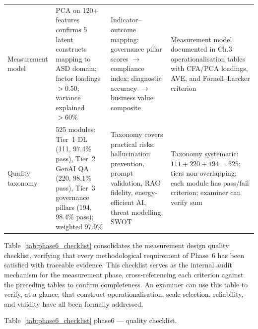 \begin{xltabular}{\textwidth}{@{} >{\raggedright\arraybackslash}p{0.17\textwidth} X X X @{}}
\addlinespace
Measurement model    & PCA on 120+ features confirms 5 latent constructs mapping to ASD domain; factor loadings $> 0.50$; variance explained $> 60\%$ & Indicator--outcome mapping: governance pillar scores $\rightarrow$ compliance index; diagnostic accuracy $\rightarrow$ business value composite & Measurement model documented in Ch.3 operationalisation tables with CFA/PCA loadings, AVE, and Fornell--Larcker criterion \\
\addlinespace
Quality taxonomy     & 525 modules: Tier~1 DL (111, 97.4\% pass), Tier~2 GenAI QA (220, 98.1\% pass), Tier~3 governance pillars (194, 98.4\% pass); weighted 97.9\% & Taxonomy covers practical risks: hallucination prevention, prompt validation, RAG fidelity, energy-efficient AI, threat modelling, SWOT & Taxonomy systematic: $111 + 220 + 194 = 525$; tiers non-overlapping; each module has pass/fail criterion; examiner can verify sum \\
\end{xltabular}
\endgroup

\vspace{1.5em}

Table~\ref{tab:phase6_checklist} consolidates the measurement design quality checklist, verifying that every methodological requirement of Phase~6 has been satisfied with traceable evidence. This checklist serves as the internal audit mechanism for the measurement phase, cross-referencing each criterion against the preceding tables to confirm completeness. An examiner can use this table to verify, at a glance, that construct operationalisation, scale selection, reliability, and validity have all been formally addressed.

\begingroup\singlespacing\tablefontsize\tablestripes
\noindent Table~\ref{tab:phase6_checklist} phase6 --- quality checklist.

